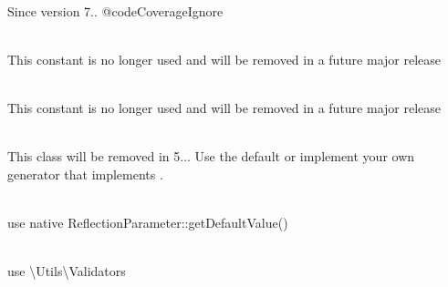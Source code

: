 \begin{DoxyRefList}
\item[Global \doxylink{interface_league_1_1_uri_1_1_contracts_1_1_query_interface_ac7ab56badccfaed38a8bb5abef4a3b5a}{Query\+Interface\+::without\+Pair} (string ... \$keys)]\hfill \\
\label{deprecated__deprecated000139}%
%
Since version 7.. @code\+Coverage\+Ignore  
\item[Global \doxylink{class_league_1_1_common_mark_1_1_extension_1_1_smart_punct_1_1_quote_parser_ac4bb7ec6743e5af81c9f3f9d7f7eaba2}{Quote\+Parser\+::DOUBLE\+\_\+\+QUOTES} ]\hfill \\
\label{deprecated__deprecated000133}%
%
This constant is no longer used and will be removed in a future major release  
\item[Global \doxylink{class_league_1_1_common_mark_1_1_extension_1_1_smart_punct_1_1_quote_parser_a7278e08de0325e37d268884db7120dd6}{Quote\+Parser\+::SINGLE\+\_\+\+QUOTES} ]\hfill \\
\label{deprecated__deprecated000134}%
%
This constant is no longer used and will be removed in a future major release  
\item[Class \doxylink{class_ramsey_1_1_uuid_1_1_generator_1_1_random_lib_adapter}{Random\+Lib\+Adapter} ]\hfill \\
\label{deprecated__deprecated000364}%
%
This class will be removed in 5... Use the default  or implement your own generator that implements . 
\item[Global \doxylink{class_nette_1_1_utils_1_1_reflection_ac43385402c5c381422a3c327b2730a57}{Reflection\+::get\+Parameter\+Default\+Value} (\textbackslash{}Reflection\+Parameter \$param)]\hfill \\
\label{deprecated__deprecated000250}%
%
use native Reflection\+Parameter\+::get\+Default\+Value()  
\item[Global \doxylink{class_nette_1_1_utils_1_1_reflection_af05b54c4df7dec8a18759e2d0519de48}{Reflection\+::is\+Builtin\+Type} (string \$type)]\hfill \\
\label{deprecated__deprecated000248}%
%
use \textbackslash{}\+Utils\textbackslash{}\+Validators  

\end{DoxyRefList}
